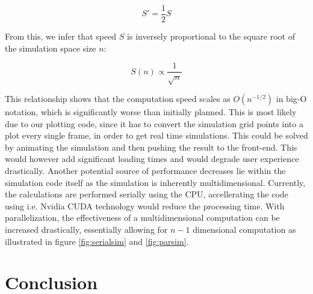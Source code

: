 \documentclass[11pt, a4paper, titlepage]{article}
\begin{document}
\[
S' = \frac{1}{2} S
\]

From this, we infer that speed \( S \) is inversely proportional to the square root of the simulation space size \( n \):

\[
S(n) \propto \frac{1}{\sqrt{n}}
\]

This relationship shows that the computation speed scales as \( O(n^{-1/2}) \) in big-O notation, which is significantly worse than initially planned. This is most likely due to our plotting code, since it has to convert the simulation grid points into a plot every single frame, in order to get real time simulations. This could be solved by animating the simulation and then pushing the result to the front-end. This would however add significant loading times and would degrade user experience drastically. Another potential source of performance decreases lie within the simulation code itself as the simulation is inherently multidimensional. Currently, the calculations are performed serially using the CPU, accellerating the code using i.e. Nvidia CUDA technology would reduce the processing time. With parallelization, the effectiveness of a multidimensional computation can be increased drastically, essentially allowing for $n-1$ dimensional computation as illustrated in figure \ref{fig:serialsim} and \ref{fig:parsim}.




\newpage
\section{Conclusion}






\end{document}
